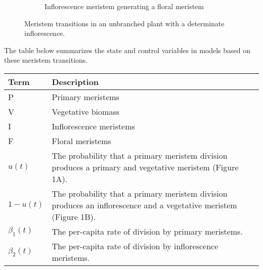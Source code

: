 \documentclass[12pt, oneside]{article}   	%
\begin{document}
\begin{figure}[hbt!]
\begin{subfigure}{.25\textwidth}
    \caption{Inflorescence meristem generating a floral meristem}
  \end{subfigure}
        \caption{Meristem transitions in an unbranched plant with a determinate inflorescence.}
    \label{fig:transitions-unbranched-determinate}
\end{figure}

The table below summarizes the state and control variables in models based on these meristem transitions.
%
\begin{table}[hbt!]
\footnotesize
\begin{tabularx}{\linewidth}{|l|X|}
\hline
\textbf{Term} & \textbf{Description} \\ \hline
 P    & Primary meristems            \\ \hline
 V   &  Vegetative biomass         \\ \hline
 I   &  Inflorescence meristems          \\ \hline
 F   &  Floral meristems          \\ \hline
 $u(t)$   &  The probability that a primary meristem division produces a primary and vegetative meristem (Figure 1A).       \\ \hline
  $1-u(t)$   &  The probability that a primary meristem division produces an inflorescence and a vegetative meristem (Figure 1B).       \\ \hline
   $\beta_1(t)$  &  The per-capita rate of division by primary meristems.     \\ \hline
  $\beta_2(t)$  &  The per-capita rate of division by inflorescence meristems.     \\ \hline
\end{tabularx}
\end{table}

\clearpage
\newpage
\end{document}
